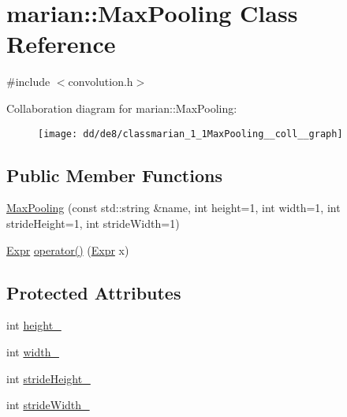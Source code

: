 \hypertarget{classmarian_1_1MaxPooling}{}\section{marian\+:\+:Max\+Pooling Class Reference}
\label{classmarian_1_1MaxPooling}


{\ttfamily \#include $<$convolution.\+h$>$}



Collaboration diagram for marian\+:\+:Max\+Pooling\+:
\nopagebreak
\begin{figure}[H]
\begin{center}
\leavevmode
\texttt{[image: dd/de8/classmarian\_1\_1MaxPooling\_\_coll\_\_graph]}
\end{center}
\end{figure}
\subsection*{Public Member Functions}
\begin{DoxyCompactItemize}
\item 
\hyperlink{classmarian_1_1MaxPooling_a99495c83c7c930ffe1a3b48bd839f4ab}{Max\+Pooling} (const std\+::string \&name, int height=1, int width=1, int stride\+Height=1, int stride\+Width=1)
\item 
\hyperlink{namespacemarian_a498d8baf75b754011078b890b39c8e12}{Expr} \hyperlink{classmarian_1_1MaxPooling_a2c05a471949d1dbd2e001f9335c6891e}{operator()} (\hyperlink{namespacemarian_a498d8baf75b754011078b890b39c8e12}{Expr} x)
\end{DoxyCompactItemize}
\subsection*{Protected Attributes}
\begin{DoxyCompactItemize}
\item 
int \hyperlink{classmarian_1_1MaxPooling_af7cdaff9d9b039ef09684dee1275338d}{height\+\_\+}
\item 
int \hyperlink{classmarian_1_1MaxPooling_a4128608033be5e33a62c1fc9a0f0e3f0}{width\+\_\+}
\item 
int \hyperlink{classmarian_1_1MaxPooling_a102c8a1113206b621dff3e8fb141af6d}{stride\+Height\+\_\+}
\item 
int \hyperlink{classmarian_1_1MaxPooling_a9a2da00f129f889191418d6ee2932b26}{stride\+Width\+\_\+}
\end{DoxyCompactItemize}
